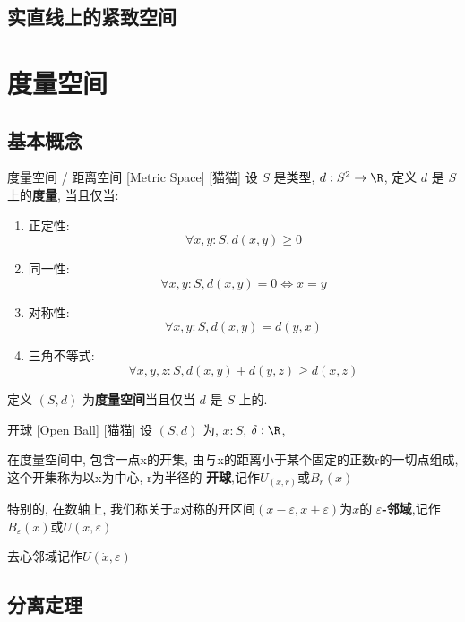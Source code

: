 \documentclass[UTF8]{ctexart}
\begin{document}
        \subsection{实直线上的紧致空间}
                

    \section{度量空间}
        
        \subsection{基本概念}
            
            \begin{dfn}
                {度量空间 / 距离空间}
                [Metric Space]
                [猫猫]
                设 \(S\) 是类型, \(d:S^2\to\R\), 定义 \(d\) 是 \(S\) 上的\textbf{度量}, 当且仅当: 
                \begin{enumerate}
                    \item 正定性: 
                    \[\forall x,y:S, d(x,y)\geq 0\]

                    \item 同一性: 
                    \[\forall x,y:S, d(x,y)=0\iff x=y\]
    
                    \item 对称性: 
                    \[\forall x,y:S, d(x,y)=d(y,x)\]
    
                    \item 三角不等式: 
                    \[\forall x,y,z:S, d(x,y)+d(y,z)\geq d(x,z)\]
                \end{enumerate}

                定义 \((S,d)\) 为\textbf{度量空间}当且仅当 \(d\) 是 \(S\) 上的. 
            \end{dfn}

            \begin{dfn}
                [OpenBall]
				{开球}
                [Open Ball]
                [猫猫]
                设 \((S,d)\) 为, \(x:S\), \(\delta:\R\), 

				在度量空间中, 包含一点x的开集, 由与x的距离小于某个固定的正数r的一切点组成, 这个开集称为以x为中心, r为半径的 \textbf{开球},记作\(U_(x,r)\)或\(B_{r}(x)\)

				特别的, 在数轴上, 我们称关于\(x\)对称的开区间\((x-\varepsilon,x+\varepsilon)\)为\(x\)的 \textbf{\(\varepsilon\)-邻域},记作\(B_{\varepsilon}(x)\)或\(U(x,\varepsilon)\)

				去心邻域记作\(U(\dot{x},\varepsilon)\)
		\end{dfn}

        \subsection{分离定理}
            
\end{document}
